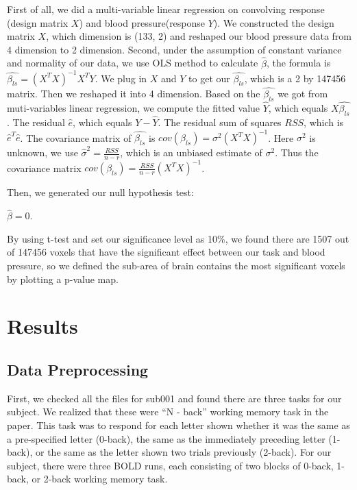 \documentclass[11pt]{article} \usepackage{graphicx} \graphicspath{ {images/} }
\begin{document}
First of all, we did a multi-variable linear regression on convolving response
(design matrix $X$) and blood pressure(response $Y$). We constructed the design
matrix $X$, which dimension is (133, 2) and reshaped our blood pressure data
from 4 dimension to 2 dimension. Second, under the assumption of constant
variance and normality of our data, we use OLS method to calculate
$\hat{\beta}$, the formula is $\hat{\beta_{ls}}=(X^{T}X)^{-1}X^{T}Y$. We plug
in $X$ and $Y$ to get our $\hat{\beta_{ls}}$, which is a 2 by 147456 matrix.
Then we reshaped it into 4 dimension. Based on the $\hat{\beta_{ls}}$ we got
from muti-variables linear regression, we compute the fitted value $\hat{Y}$,
which equals $X\hat{\beta_{ls}}$. The residual $\hat{e}$, which equals
$Y-\hat{Y}$. The residual sum of squares $RSS$, which is $\hat{e}^{T}\hat{e}$.
The covariance matrix of $\hat{\beta_{ls}}$ is $cov(\beta_{ls}) =
\sigma^2(X^{T}X)^{-1}$. Here $\sigma^2$ is unknown, we use $\hat{\sigma}^2 =
\frac{RSS}{n-r}$, which is an unbiased estimate of $\sigma^2$. Thus the
covariance matrix $cov(\beta_{ls}) = \frac{RSS}{n-r}(X^{T}X)^{-1}$.

Then, we generated our null hypothesis test:

$\hat{\beta} = 0$.

By using t-test and set our significance level as 10\%, we found there are 1507
out of 147456 voxels that have the significant effect between our task and
blood pressure, so we defined the sub-area of brain contains the most
significant voxels by plotting a p-value map.

\section{Results} 

\subsection{Data Preprocessing} 

First, we checked all the files for sub001 and found there are three tasks for
our subject. We realized that these were ``N - back'' working memory task in
the paper. This task was to respond for each letter shown whether it was the
same as a pre-specified letter (0-back), the same as the immediately preceding
letter (1-back), or the same as the letter shown two trials previously
(2-back). For our subject, there were three BOLD runs, each consisting of two
blocks of 0-back, 1-back, or 2-back working memory task. 
\end{document}
